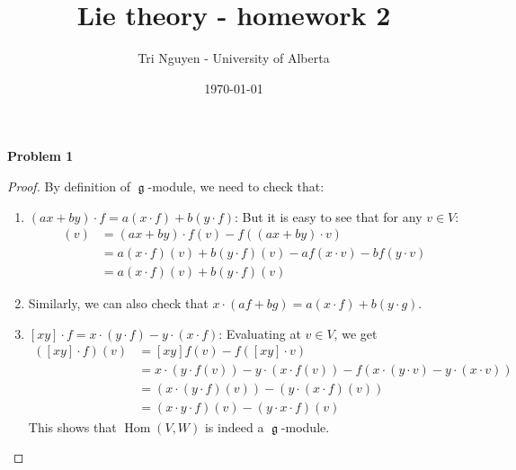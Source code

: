 \documentclass[12pt]{article} %
\title{Lie theory - homework 2} %
\author{Tri Nguyen - University of Alberta} %
\date{\today} %
\DeclareMathOperator{\Hom}{Hom}
\DeclareMathOperator{\frkg}{\mathfrak{g}}
\begin{document}
\maketitle
\textbf{Problem 1}
\begin{proof}
    By definition of $\frkg$-module, we need to check that:
    \begin{enumerate}
        \item $(ax+by)\cdot f = a(x\cdot f)+ b(y\cdot f)$: But it is easy to see that for any $v \in V$:
              \begin{align*}
                  [(ax+by) \cdot f](v) & = (ax+by)\cdot f(v)- f((ax+by)\cdot v)                       \\
                                       & = a(x\cdot f)(v)+b(y\cdot f)(v) - af(x\cdot v)-b f(y\cdot v) \\
                                       & = a(x\cdot f)(v)+b(y\cdot f)(v)
              \end{align*}
        \item Similarly, we can also check that $x\cdot(af+bg) = a(x\cdot f)+ b(y \cdot g)$.
        \item $[xy]\cdot f = x\cdot (y\cdot f)-y\cdot (x \cdot f)$: Evaluating at $v \in V$, we get
              \begin{align*}
                  ([xy]\cdot f)(v) & = [xy]f(v)-f([xy]\cdot v)                                                       \\
                                   & =x\cdot (y\cdot f(v))-y\cdot(x\cdot f(v))-f(x\cdot (y\cdot v)-y\cdot(x\cdot v)) \\
                                   & = (x\cdot (y\cdot f)(v))-(y\cdot (x\cdot f)(v))                                 \\
                                   & =(x\cdot y\cdot f)(v)- (y\cdot x \cdot f)(v)
              \end{align*}
              This shows that $\Hom(V,W)$ is indeed a $\frkg$-module.
    \end{enumerate}


\end{proof}
\end{document}

